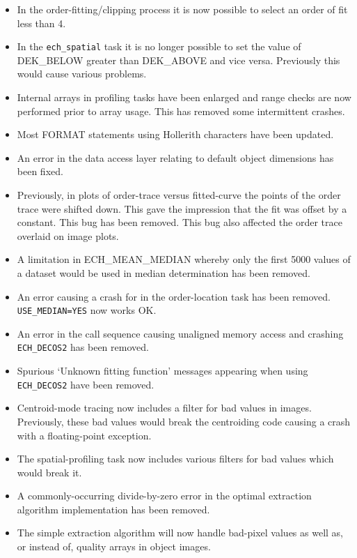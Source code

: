 \begin{itemize}
\item In the order-fitting/clipping process it is now possible to
   select an order of fit less than 4.
\item In the {\tt ech\_spatial} task it is no longer possible to set the
   value of DEK\_BELOW greater than DEK\_ABOVE and vice versa.
   Previously this would cause various problems.
\item Internal arrays in profiling tasks have been enlarged and
   range checks are now performed prior to array usage.  This
   has removed some intermittent crashes.
\item Most FORMAT statements using Hollerith characters have been updated.
\item An error in the data access layer relating to default object
   dimensions has been fixed.
\item Previously, in plots of order-trace versus fitted-curve the points
   of the order trace were shifted down.  This gave the impression that
   the fit was offset by a constant.  This bug has been removed.
   This bug also affected the order trace overlaid on image plots.
\item A limitation in ECH\_MEAN\_MEDIAN whereby only the first 5000 values of
   a dataset would be used in median determination has been removed.
\item An error causing a crash for
    in the order-location
   task has been removed.  {\tt USE\_MEDIAN=YES} now works OK.
\item An error in the call sequence causing unaligned memory access and
   crashing {\tt ECH\_DECOS2} has been removed.
\item Spurious `Unknown fitting function' messages appearing when using
   {\tt ECH\_DECOS2} have been removed.
\item Centroid-mode tracing now includes a filter for bad values in images.
   Previously, these bad values would break the centroiding code causing
   a crash with a floating-point exception.
\item The spatial-profiling task now includes various filters for bad
   values which would break it.
\item A commonly-occurring divide-by-zero error in the optimal extraction
   algorithm implementation has been removed.
\item The simple extraction algorithm will now handle bad-pixel values as
   well as, or instead of, quality arrays in object images.

\end{itemize}
